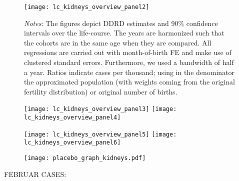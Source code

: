\begin{landscape}
\begin{figure}[H]
\centering
\begin{minipage}{.9\linewidth}
\texttt{[image: lc\_kidneys\_overview\_panel2]}
{\scriptsize \emph{Notes:} The figures depict DDRD estimates and 90\% confidence intervals over the life-course. The years are harmonized such that the cohorts are in the same age when they are compared. All regressions are carried out with month-of-birth FE and make use of clustered standard errors. Furthermore, we used a bandwidth of half a year. Ratios indicate cases per thousand; using in the denominator the approximated population (with weights coming from the original fertility distribution) or original number of births. \par}
\end{minipage}
\end{figure}
\end{landscape}
\begin{figure}[H]%
	\centering
	\texttt{[image: lc\_kidneys\_overview\_panel3]}
	\texttt{[image: lc\_kidneys\_overview\_panel4]}
\end{figure}
\begin{figure}[H]
	\centering	
	\texttt{[image: lc\_kidneys\_overview\_panel5]}
	\texttt{[image: lc\_kidneys\_overview\_panel6]}
\end{figure}
%
\begin{figure}[H]%
	\centering
	\texttt{[image: placebo\_graph\_kidneys.pdf]}
\end{figure}




%
FEBRUAR CASES:


